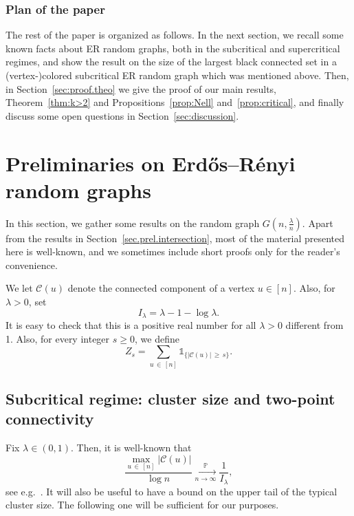 \documentclass[10pt]{amsart}
\theoremstyle{definition}\newtheorem{defi}[theo]{Definition}\newtheorem{rema}[theo]{Remark}\newtheorem{exam}[theo]{Example}\newtheorem{exem}[theo]{Example}\newtheorem{nota}[theo]{Notation}
\renewcommand{\Pr}{\mathbb{P}}
\newcommand{\cC}{\mathcal{C}}
\begin{document}
\subsubsection*{Plan of the paper}
The rest of the paper is organized as follows. In the next section, we recall some known facts about ER random graphs, both in the subcritical and supercritical regimes, and show the result on the size of the largest black connected set in a (vertex-)colored subcritical ER random graph which was mentioned above. Then, in Section~\ref{sec:proof.theo} we give the proof of our main results, Theorem~\ref{thm:k>2} and Propositions~\ref{prop:Nell} and~\ref{prop:critical}, and finally discuss some open questions in Section~\ref{sec:discussion}.

\section{\texorpdfstring{Preliminaries on Erd\H{o}s--Rényi random graphs}{}}

In this section, we gather some results on the random graph $G(n,\tfrac \lambda n)$. Apart from the results in Section~\ref{sec.prel.intersection}, most of the material presented here is well-known, and we sometimes include short proofs only for the reader's convenience.

We let $\cC(u)$ denote the connected component of a vertex $u \in [n]$. Also, for $\lambda>0$, set
\begin{equation}\label{def.Ilambda}
I_\lambda = \lambda- 1 - \log \lambda.
\end{equation}
It is easy to check that this is a positive real number for all $\lambda>0$ different from 1. Also, for every integer $s\ge 0$, we define
\[
Z_s = \sum_{u\,\in\,[n]} \mathds{1}_{\{|\cC(u)|\,\ge\, s\}}.
\]


\subsection{Subcritical regime: cluster size and two-point connectivity} Fix $\lambda\in (0,1)$. Then, it is well-known that
\begin{equation}\label{LLN.subcritical}
\frac{\max_{u\,\in\,[n]} |\cC(u)|}{\log n} \xrightarrow[n\to \infty]{\Pr} \frac 1{I_\lambda},
\end{equation}
see e.g.~\cite[Theorems~4.4 and 4.5]{Hof16}. It will also be useful to have a bound on the upper tail of the typical cluster size. The following one will be sufficient for our purposes.
\end{document}
